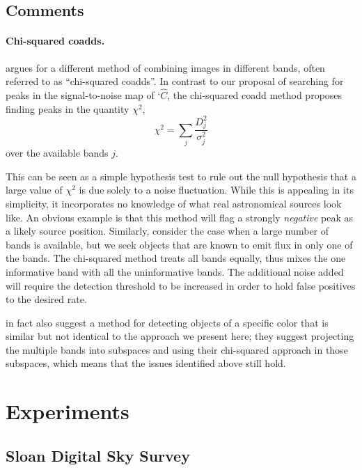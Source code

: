 \documentclass[letterpaper,preprint]{aastex}
\begin{document}
\subsection{Comments}

\paragraph{Chi-squared coadds.}
\cite{szalay} argues for a different method of combining images in
different bands, often referred to as ``chi-squared coadds''.  In
contrast to our proposal of searching for peaks in the signal-to-noise
map of `$\hat{C}$, the chi-squared coadd method proposes finding peaks
in the quantity $\chi^2$,
\begin{equation}
  \chi^2 = \sum_j \frac{D_j^2}{\sigma_j^2}
\end{equation}
over the available bands $j$.

This can be seen as a simple hypothesis test to rule out the null
hypothesis that a large value of $\chi^2$ is due solely to a noise
fluctuation.  While this is appealing in its simplicity, it
incorporates no knowledge of what real astronomical sources look like.
An obvious example is that this method will flag a strongly
\emph{negative} peak as a likely source position.  Similarly, consider
the case when a large number of bands is available, but we seek
objects that are known to emit flux in only one of the bands.  The
chi-squared method treats all bands equally, thus mixes the one
informative band with all the uninformative bands.  The additional
noise added will require the detection threshold to be increased in
order to hold false positives to the desired rate.

\cite{szalay} in fact also suggest a method for detecting objects of a
specific color that is similar but not identical to the approach we
present here; they suggest projecting the multiple bands into
subspaces and using their chi-squared approach in those subspaces,
which means that the issues identified above still hold.




\section{Experiments}

\subsection{Sloan Digital Sky Survey}
\end{document}

